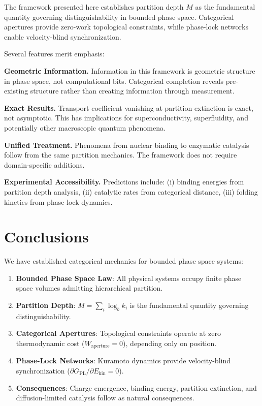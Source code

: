 \documentclass[twocolumn,amsmath,amssymb,aps,prl,superscriptaddress]{revtex4-2}
\newcommand{\Mpart}{M}
\newcommand{\Gfree}{G_{\text{PL}}}
\newcommand{\Ekin}{E_{\text{kin}}}
\newcommand{\Wapert}{W_{\text{aperture}}}
\begin{document}
The framework presented here establishes partition depth $\Mpart$ as the fundamental quantity governing distinguishability in bounded phase space. Categorical apertures provide zero-work topological constraints, while phase-lock networks enable velocity-blind synchronization.

Several features merit emphasis:

\textbf{Geometric Information.} Information in this framework is geometric structure in phase space, not computational bits. Categorical completion reveals pre-existing structure rather than creating information through measurement.

\textbf{Exact Results.} Transport coefficient vanishing at partition extinction is exact, not asymptotic. This has implications for superconductivity, superfluidity, and potentially other macroscopic quantum phenomena.

\textbf{Unified Treatment.} Phenomena from nuclear binding to enzymatic catalysis follow from the same partition mechanics. The framework does not require domain-specific additions.

\textbf{Experimental Accessibility.} Predictions include: (i) binding energies from partition depth analysis, (ii) catalytic rates from categorical distance, (iii) folding kinetics from phase-lock dynamics.

\section{Conclusions}

We have established categorical mechanics for bounded phase space systems:

\begin{enumerate}
\item \textbf{Bounded Phase Space Law}: All physical systems occupy finite phase space volumes admitting hierarchical partition.

\item \textbf{Partition Depth}: $\Mpart = \sum_i \log_b k_i$ is the fundamental quantity governing distinguishability.

\item \textbf{Categorical Apertures}: Topological constraints operate at zero thermodynamic cost ($\Wapert = 0$), depending only on position.

\item \textbf{Phase-Lock Networks}: Kuramoto dynamics provide velocity-blind synchronization ($\partial \Gfree / \partial \Ekin = 0$).

\item \textbf{Consequences}: Charge emergence, binding energy, partition extinction, and diffusion-limited catalysis follow as natural consequences.
\end{enumerate}
\end{document}
